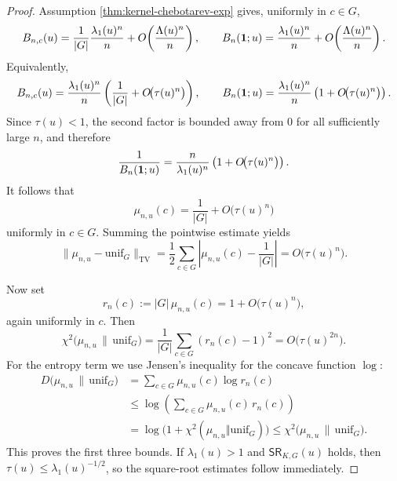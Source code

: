 \begin{proof}
Assumption \ref{thm:kernel-chebotarev-exp} gives, uniformly in \(c\in G\),
\[
B_{n,c}(u)
=
\frac{1}{|G|}\frac{\lambda_1(u)^n}{n}
+
O\!\left(\frac{\Lambda(u)^n}{n}\right),
\qquad
B_n(\mathbf{1};u)
=
\frac{\lambda_1(u)^n}{n}
+
O\!\left(\frac{\Lambda(u)^n}{n}\right).
\]
Equivalently,
\[
B_{n,c}(u)
=
\frac{\lambda_1(u)^n}{n}\left(\frac{1}{|G|}+O\!\bigl(\tau(u)^n\bigr)\right),
\qquad
B_n(\mathbf{1};u)
=
\frac{\lambda_1(u)^n}{n}\left(1+O\!\bigl(\tau(u)^n\bigr)\right).
\]
Since \(\tau(u)<1\), the second factor is bounded away from \(0\) for all sufficiently large \(n\), and therefore
\[
\frac{1}{B_n(\mathbf{1};u)}
=
\frac{n}{\lambda_1(u)^n}\left(1+O\!\bigl(\tau(u)^n\bigr)\right).
\]
It follows that
\[
\mu_{n,u}(c)=\frac{1}{|G|}+O\!\bigl(\tau(u)^n\bigr)
\]
uniformly in \(c\in G\). Summing the pointwise estimate yields
\[
\|\mu_{n,u}-\mathrm{unif}_G\|_{\mathrm{TV}}
=
\frac12\sum_{c\in G}\left|\mu_{n,u}(c)-\frac{1}{|G|}\right|
=
O\!\bigl(\tau(u)^n\bigr).
\]

Now set
\[
r_n(c):=|G|\,\mu_{n,u}(c)=1+O\!\bigl(\tau(u)^n\bigr),
\]
again uniformly in \(c\). Then
\[
\chi^2\!\bigl(\mu_{n,u}\,\|\,\mathrm{unif}_G\bigr)
=
\frac{1}{|G|}\sum_{c\in G}(r_n(c)-1)^2
=
O\!\bigl(\tau(u)^{2n}\bigr).
\]
For the entropy term we use Jensen's inequality for the concave function \(\log\):
\[
\begin{aligned}
D\!\bigl(\mu_{n,u}\,\|\,\mathrm{unif}_G\bigr)
&=
\sum_{c\in G}\mu_{n,u}(c)\log r_n(c)\\
&\le
\log\!\left(\sum_{c\in G}\mu_{n,u}(c)\,r_n(c)\right)\\
&=
\log\!\bigl(1+\chi^2(\mu_{n,u}\Vert \mathrm{unif}_G)\bigr)
\le
\chi^2\!\bigl(\mu_{n,u}\,\|\,\mathrm{unif}_G\bigr).
\end{aligned}
\]
This proves the first three bounds. If \(\lambda_1(u)>1\) and \(\textsf{SR}_{K,G}(u)\) holds, then \(\tau(u)\le\lambda_1(u)^{-1/2}\), so the square-root estimates follow immediately.


\end{proof}
